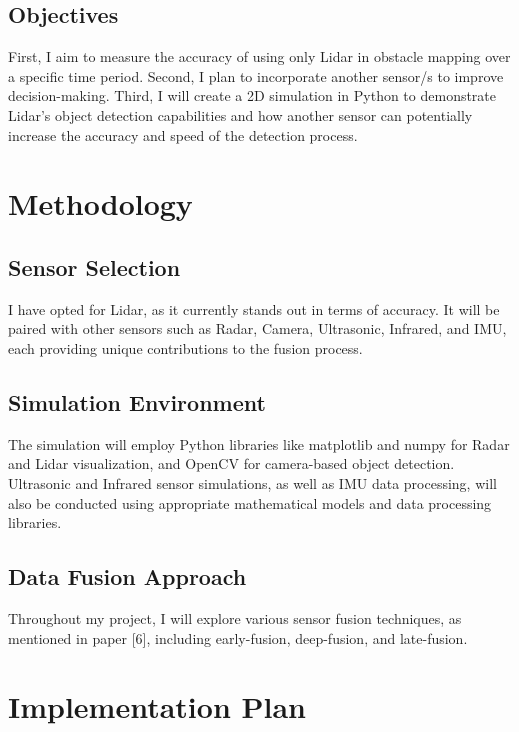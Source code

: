 \documentclass[letterpaper, 10 pt, conference]{ieeeconf}  %
\begin{document}
\subsection{Objectives}   
First, I aim to measure the accuracy of using only Lidar in obstacle mapping over a specific time period. Second, I plan to incorporate another sensor/s to improve decision-making. Third, I will create a 2D simulation in Python to demonstrate Lidar's object detection capabilities and how another sensor can potentially increase the accuracy and speed of the detection process.

\section{Methodology}

\subsection{Sensor Selection}

I have opted for Lidar, as it currently stands out in terms of accuracy. It will be paired with other sensors such as Radar, Camera, Ultrasonic, Infrared, and IMU, each providing unique contributions to the fusion process.
\subsection{Simulation Environment}
The simulation will employ Python libraries like matplotlib and numpy for Radar and Lidar visualization, and OpenCV for camera-based object detection. Ultrasonic and Infrared sensor simulations, as well as IMU data processing, will also be conducted using appropriate mathematical models and data processing libraries.
\subsection{Data Fusion Approach}
Throughout my project, I will explore various sensor fusion techniques, as mentioned in paper [6], including early-fusion, deep-fusion, and late-fusion.

\section{Implementation Plan}
\end{document}
